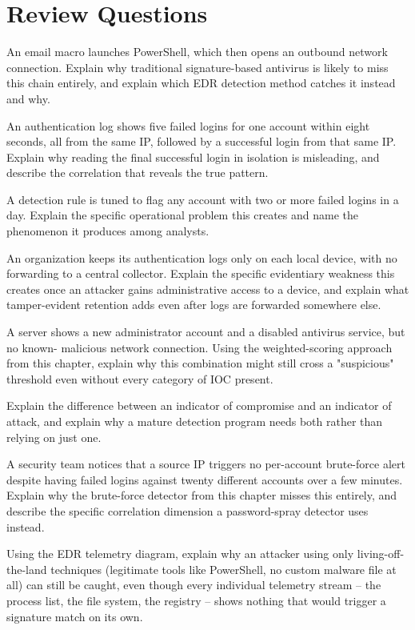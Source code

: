 \section*{Review Questions}
\begin{reviewquestions}
\item An email macro launches PowerShell, which then opens an outbound network connection.
Explain why traditional signature-based antivirus is likely to miss this chain entirely, and
explain which EDR detection method catches it instead and why.
\item An authentication log shows five failed logins for one account within eight seconds, all
from the same IP, followed by a successful login from that same IP. Explain why reading the final
successful login in isolation is misleading, and describe the correlation that reveals the true
pattern.
\item A detection rule is tuned to flag any account with two or more failed logins in a day.
Explain the specific operational problem this creates and name the phenomenon it produces among
analysts.
\item An organization keeps its authentication logs only on each local device, with no forwarding
to a central collector. Explain the specific evidentiary weakness this creates once an attacker
gains administrative access to a device, and explain what tamper-evident retention adds even after
logs are forwarded somewhere else.
\item A server shows a new administrator account and a disabled antivirus service, but no known-
malicious network connection. Using the weighted-scoring approach from this chapter, explain why
this combination might still cross a "suspicious" threshold even without every category of IOC
present.
\item Explain the difference between an indicator of compromise and an indicator of attack, and
explain why a mature detection program needs both rather than relying on just one.
\item A security team notices that a source IP triggers no per-account brute-force alert despite
having failed logins against twenty different accounts over a few minutes. Explain why the
brute-force detector from this chapter misses this entirely, and describe the specific
correlation dimension a password-spray detector uses instead.
\item Using the EDR telemetry diagram, explain why an attacker using only living-off-the-land
techniques (legitimate tools like PowerShell, no custom malware file at all) can still be caught,
even though every individual telemetry stream -- the process list, the file system, the registry --
shows nothing that would trigger a signature match on its own.
\end{reviewquestions}

